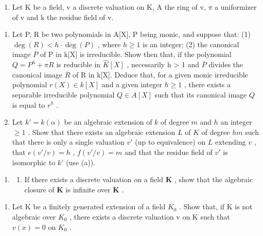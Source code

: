 \begin{enumerate}
\def\labelenumi{\arabic{enumi}.}
\setcounter{enumi}{20}
\tightlist
\item
  Let K be a field, v a discrete valuation on K, A the ring of v, \(\pi\) a uniformizer of v and k the residue field of v.
\end{enumerate}

\begin{enumerate}
\def\labelenumi{(\alph{enumi})}
\item
  Let P, R be two polynomials in A{[}X{]}, P being monic, and suppose that: (1) \(\deg(R) < h \cdot \deg(P)\) , where \(h \geqslant 1\) is an integer; (2) the canonical image \(\overline{P}\) of P in k{[}X{]} is irreducible. Show then that, if the polynomial \(Q = P^{h} + \pi R\) is reducible in \(\widehat{K}[X]\) , necessarily h \textgreater{} 1 and \(\overline{P}\) divides the canonical image \(\overline{R}\) of R in k{[}X{]}. Deduce that, for a given monic irreducible polynomial \(r(X) \in k[X]\) and a given integer \(h \geqslant 1\) , there exists a separable irreducible polynomial \(Q \in A[X]\) such that its canonical image \(\overline{Q}\) is equal to \(r^{h}\) .
\item
  Let \(k' = k(\alpha)\) be an algebraic extension of \(k\) of degree \(m\) and \(h\) an integer \(\geqslant 1\) . Show that there exists an algebraic extension \(L\) of \(K\) of degree \(hm\) such that there is only a single valuation \(v'\) (up to equivalence) on \(L\) extending \(v\) , that \(e(v'/v) = h\) , \(f(v'/v) = m\) and that the residue field of \(v'\) is isomorphic to \(k'\) (use (a)).
\end{enumerate}

\begin{enumerate}
\def\labelenumi{\arabic{enumi}.}
\setcounter{enumi}{21}
\tightlist
\item
  \begin{enumerate}
  \def\labelenumii{(\alph{enumii})}
  \tightlist
  \item
    If there exists a discrete valuation on a field \(\mathbf{K}\) , show that the algebraic closure of \(\mathbf{K}\) is infinite over \(\mathbf{K}\) .
  \end{enumerate}
\end{enumerate}

\begin{enumerate}
\def\labelenumi{(\alph{enumi})}
\setcounter{enumi}{1}
\tightlist
\item
  Let K be a finitely generated extension of a field \(K_{0}\) . Show that, if K is not algebraic over \(K_{0}\) , there exists a discrete valuation v on K such that \(v(x) = 0\) on \(K_{0}\) .
\end{enumerate}

